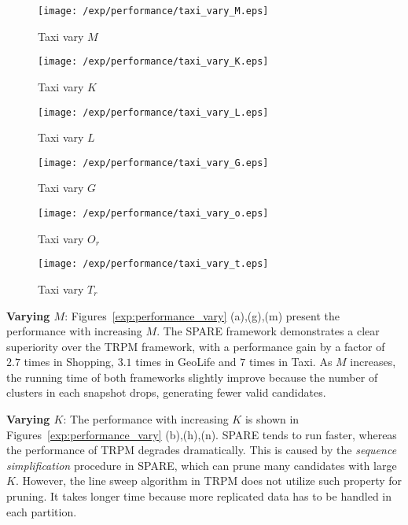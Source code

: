 \begin{figure*}[t]
    \begin{subfigure}[b]{0.16\textwidth}
        \texttt{[image: /exp/performance/taxi\_vary\_M.eps]}
        \caption{Taxi vary $M$}
    \end{subfigure}
    \begin{subfigure}[b]{0.16\textwidth}
        \texttt{[image: /exp/performance/taxi\_vary\_K.eps]}
        \caption{Taxi vary $K$}
    \end{subfigure}
    \begin{subfigure}[b]{0.16\textwidth}
        \texttt{[image: /exp/performance/taxi\_vary\_L.eps]}
        \caption{Taxi vary $L$}
    \end{subfigure}
       \begin{subfigure}[b]{0.16\textwidth}
        \texttt{[image: /exp/performance/taxi\_vary\_G.eps]}
        \caption{Taxi vary $G$}
    \end{subfigure}   
	 \begin{subfigure}[b]{0.16\textwidth}
        \texttt{[image: /exp/performance/taxi\_vary\_o.eps]}
        \caption{Taxi vary $O_r$}
    \end{subfigure}
    	 \begin{subfigure}[b]{0.16\textwidth}
        \texttt{[image: /exp/performance/taxi\_vary\_t.eps]}
        \caption{Taxi vary $T_r$}
    \end{subfigure}      
\caption{Performance of SPARE and TRPM on real datasets under different pattern parameters.}
\label{exp:performance_vary}
\end{figure*}


\textbf{Varying $M$}: Figures~\ref{exp:performance_vary} (a),(g),(m)
present the performance with increasing $M$. The SPARE framework demonstrates a clear superiority over the TRPM framework, with 
a performance gain by a factor of  $2.7$ times in Shopping, $3.1$ times in GeoLife and
$7$ times in Taxi. As $M$ increases, the running time of both frameworks slightly improve because the number of clusters in each snapshot drops, generating fewer valid candidates.



\textbf{Varying $K$}: The performance with increasing $K$ is shown in Figures~\ref{exp:performance_vary} (b),(h),(n).  SPARE tends to run faster, whereas the performance of TRPM degrades dramatically. This is caused by the \emph{sequence simplification} procedure in SPARE, which can prune many candidates with large $K$. However, the line sweep algorithm in TRPM does not utilize such property for pruning. It takes longer time because more replicated data has to be handled in each partition.

